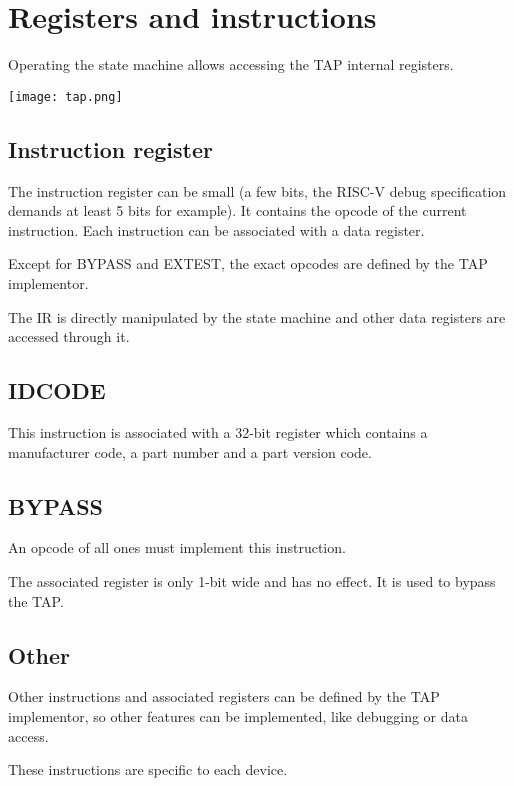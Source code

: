 \documentclass{article}
\begin{document}
	
	\section{Registers and instructions}
	
	Operating the state machine allows accessing the TAP internal registers.
	
	\begin{center}
	\texttt{[image: tap.png]}
	\end{center}
	
	\subsection{Instruction register}
	
	The instruction register can be small (a few bits, the RISC-V debug specification demands at least 5 bits for example). It contains the opcode of the current instruction. Each instruction can be associated with a data register.
	
	Except for BYPASS and EXTEST, the exact opcodes are defined by the TAP implementor.
	
	The IR is directly manipulated by the state machine and other data registers are accessed through it.
	
	\subsection{IDCODE}
	
	This instruction is associated with a 32-bit register which contains a manufacturer code, a part number and a part version code.
	
	\subsection{BYPASS}
	
	An opcode of all ones must implement this instruction.
	
	The associated register is only 1-bit wide and has no effect. It is used to bypass the TAP.
	
	\subsection{Other}
	
	Other instructions and associated registers can be defined by the TAP implementor, so other features can be implemented, like debugging or data access.
	
	These instructions are specific to each device.
	
\end{document}
